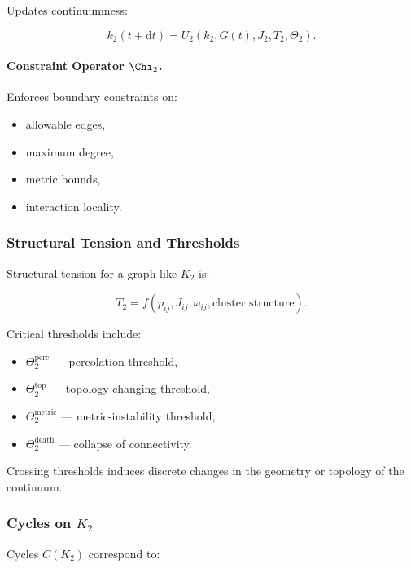 Updates continuumness:

\[
k_2(t+\mathrm{d}t) = U_2(k_2, G(t), J_2, T_2, \Theta_2).
\]

\paragraph{Constraint Operator \texorpdfstring{$\Chi_2$}{\Chi_2}.}

Enforces boundary constraints on:

\begin{itemize}
    \item allowable edges,
    \item maximum degree,
    \item metric bounds,
    \item interaction locality.
\end{itemize}

\subsubsection{Structural Tension and Thresholds}

Structural tension for a graph-like $K_2$ is:

\[
T_2 = f(p_{ij}, J_{ij}, \omega_{ij}, \text{cluster structure}).
\]

Critical thresholds include:

\begin{itemize}
    \item $\Theta_2^{\text{perc}}$ — percolation threshold,
    \item $\Theta_2^{\text{top}}$ — topology-changing threshold,
    \item $\Theta_2^{\text{metric}}$ — metric-instability threshold,
    \item $\Theta_2^{\text{death}}$ — collapse of connectivity.
\end{itemize}

Crossing thresholds induces discrete changes in the geometry or topology
of the continuum.

\subsubsection{Cycles on \texorpdfstring{$K_2$}{K_2}}

Cycles $C(K_2)$ correspond to:

